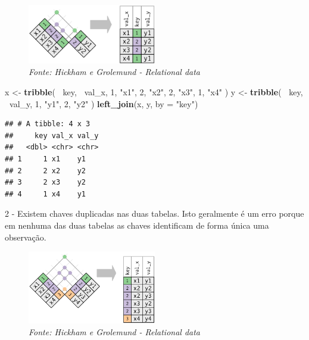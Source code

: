 \documentclass[
]{article}
\newenvironment{Shaded}{\begin{snugshade}}{\end{snugshade}}
\newcommand{\DataTypeTok}[1]{\textcolor[rgb]{0.13,0.29,0.53}{#1}}
\newcommand{\DecValTok}[1]{\textcolor[rgb]{0.00,0.00,0.81}{#1}}
\newcommand{\KeywordTok}[1]{\textcolor[rgb]{0.13,0.29,0.53}{\textbf{#1}}}
\newcommand{\NormalTok}[1]{#1}
\newcommand{\OperatorTok}[1]{\textcolor[rgb]{0.81,0.36,0.00}{\textbf{#1}}}
\newcommand{\StringTok}[1]{\textcolor[rgb]{0.31,0.60,0.02}{#1}}
\begin{document}
\begin{figure}
\centering
\includegraphics[width=0.5\textwidth,height=\textheight]{join-one-to-many.png}
\caption{\emph{Fonte: Hickham e Grolemund - Relational data}}
\end{figure}

\begin{Shaded}
\begin{Highlighting}[]
\NormalTok{x <-}\StringTok{ }\KeywordTok{tribble}\NormalTok{(}
  \OperatorTok{~}\NormalTok{key, }\OperatorTok{~}\NormalTok{val_x,}
     \DecValTok{1}\NormalTok{, }\StringTok{"x1"}\NormalTok{,}
     \DecValTok{2}\NormalTok{, }\StringTok{"x2"}\NormalTok{,}
     \DecValTok{2}\NormalTok{, }\StringTok{"x3"}\NormalTok{,}
     \DecValTok{1}\NormalTok{, }\StringTok{"x4"}
\NormalTok{)}
\NormalTok{y <-}\StringTok{ }\KeywordTok{tribble}\NormalTok{(}
  \OperatorTok{~}\NormalTok{key, }\OperatorTok{~}\NormalTok{val_y,}
     \DecValTok{1}\NormalTok{, }\StringTok{"y1"}\NormalTok{,}
     \DecValTok{2}\NormalTok{, }\StringTok{"y2"}
\NormalTok{)}
\KeywordTok{left_join}\NormalTok{(x, y, }\DataTypeTok{by =} \StringTok{"key"}\NormalTok{)}
\end{Highlighting}
\end{Shaded}

\begin{verbatim}
## # A tibble: 4 x 3
##     key val_x val_y
##   <dbl> <chr> <chr>
## 1     1 x1    y1   
## 2     2 x2    y2   
## 3     2 x3    y2   
## 4     1 x4    y1
\end{verbatim}

2 - Existem chaves duplicadas nas duas tabelas. Isto geralmente é um
erro porque em nenhuma das duas tabelas as chaves identificam de forma
única uma observação.

\begin{figure}
\centering
\includegraphics[width=0.5\textwidth,height=\textheight]{join-many-to-many.png}
\caption{\emph{Fonte: Hickham e Grolemund - Relational data}}
\end{figure}
\end{document}
